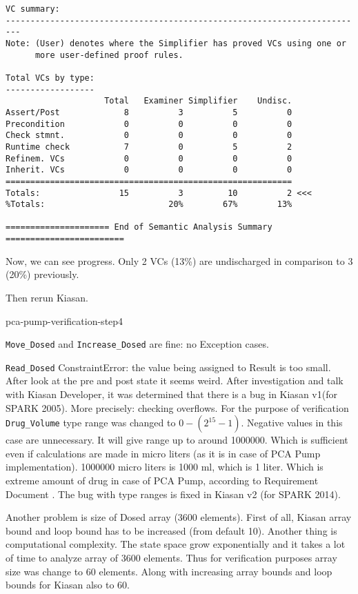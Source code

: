 \begin{lstlisting}[frame=single, gobble=0, caption={Second POGS report}, label={listing:pcapump_dosemonitor_pogs2}]
VC summary:
-------------------------------------------------------------------------
Note: (User) denotes where the Simplifier has proved VCs using one or
      more user-defined proof rules.

Total VCs by type:
------------------
                    Total   Examiner Simplifier    Undisc.
Assert/Post             8          3          5          0
Precondition            0          0          0          0
Check stmnt.            0          0          0          0
Runtime check           7          0          5          2
Refinem. VCs            0          0          0          0
Inherit. VCs            0          0          0          0
==========================================================
Totals:                15          3         10          2 <<<
%Totals:                         20%        67%        13%

===================== End of Semantic Analysis Summary ========================
\end{lstlisting}

Now, we can see progress. Only 2 VCs (13\%) are undischarged in comparison to 3 (20\%) previously.

Then rerun Kiasan.

pca-pump-verification-step4

\lstinline{Move_Dosed} and \lstinline{Increase_Dosed} are fine: no Exception cases.

\lstinline{Read_Dosed} ConstraintError: the value being assigned to Result is too small. After look at the pre and post state it seems weird. After investigation and talk with Kiasan Developer, it was determined that there is a bug in Kiasan v1(for SPARK 2005). More precisely: checking overflows. For the purpose of verification \lstinline{Drug_Volume} type range was changed to $0 - (2^{15} - 1)$. Negative values in this case are unnecessary. It will give range up to around 1000000. Which is sufficient even if calculations are made in micro liters (as it is in case of PCA Pump implementation). 1000000 micro liters is 1000 ml, which is 1 liter. Which is extreme amount of drug in case of PCA Pump, according to Requirement Document \cite{OpenSourcePCAPump:Paper}. The bug with type ranges is fixed in Kiasan v2 (for SPARK 2014).

Another problem is size of Dosed array (3600 elements). First of all, Kiasan array bound and loop bound has to be increased (from default 10). Another thing is computational complexity. The state space grow exponentially and it takes a lot of time to analyze array of 3600 elements. Thus for verification purposes array size was change to 60 elements. Along with increasing array bounds and loop bounds for Kiasan also to 60.

